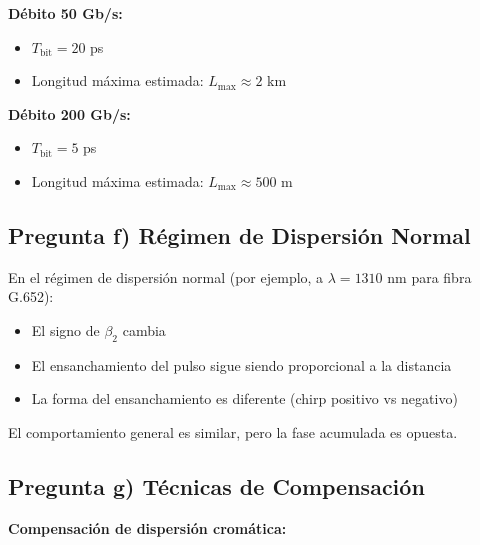 \documentclass[11pt,a4paper]{article}
\begin{document}
\textbf{Débito 50 Gb/s:}
\begin{itemize}
    \item $T_{\text{bit}} = 20$ ps
    \item Longitud máxima estimada: $L_{\max} \approx 2$ km
\end{itemize}

\textbf{Débito 200 Gb/s:}
\begin{itemize}
    \item $T_{\text{bit}} = 5$ ps
    \item Longitud máxima estimada: $L_{\max} \approx 500$ m
\end{itemize}

\subsection{Pregunta f) Régimen de Dispersión Normal}

En el régimen de dispersión normal (por ejemplo, a $\lambda = 1310$ nm para fibra G.652):
\begin{itemize}
    \item El signo de $\beta_2$ cambia
    \item El ensanchamiento del pulso sigue siendo proporcional a la distancia
    \item La forma del ensanchamiento es diferente (chirp positivo vs negativo)
\end{itemize}

El comportamiento general es similar, pero la fase acumulada es opuesta.

\subsection{Pregunta g) Técnicas de Compensación}

\textbf{Compensación de dispersión cromática:}
\end{document}
